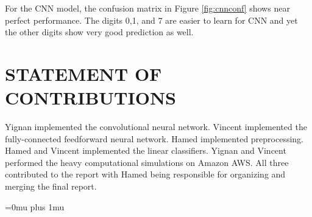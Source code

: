 \documentclass[letterpaper, 10 pt, conference]{ieeeconf}  %
\begin{document}
For the CNN model, the confusion matrix in Figure \ref{fig:cnnconf} shows near perfect performance. The digits 0,1, and 7 are easier to learn for CNN and yet the other digits show very good prediction as well.


\addtolength{\textheight}{-12cm}   %






\section*{STATEMENT OF CONTRIBUTIONS}
Yignan implemented the convolutional neural network.
Vincent implemented the fully-connected feedforward neural
network. Hamed implemented preprocessing. Hamed and Vincent implemented the linear classifiers. Yignan and Vincent performed the heavy computational simulations on Amazon AWS. All three contributed to the report with Hamed being responsible for organizing and merging the final report.






\Urlmuskip=0mu plus 1mu\relax


%
\end{document}
